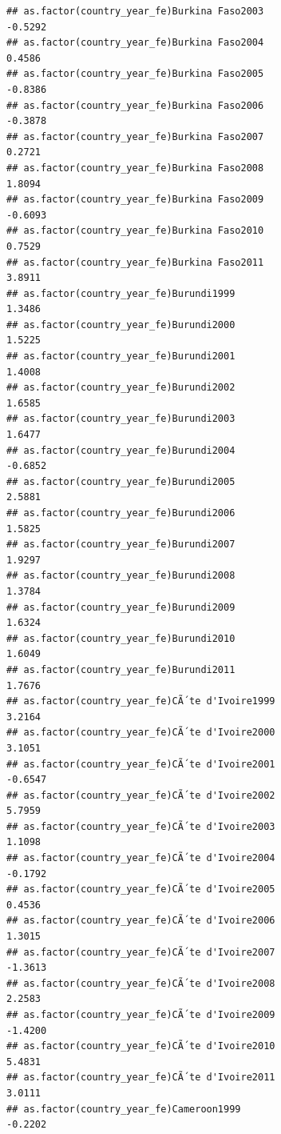 \documentclass[
  a4paper,
]{article}
\begin{document}
\begin{verbatim}
## as.factor(country_year_fe)Burkina Faso2003                     -0.5292
## as.factor(country_year_fe)Burkina Faso2004                      0.4586
## as.factor(country_year_fe)Burkina Faso2005                     -0.8386
## as.factor(country_year_fe)Burkina Faso2006                     -0.3878
## as.factor(country_year_fe)Burkina Faso2007                      0.2721
## as.factor(country_year_fe)Burkina Faso2008                      1.8094
## as.factor(country_year_fe)Burkina Faso2009                     -0.6093
## as.factor(country_year_fe)Burkina Faso2010                      0.7529
## as.factor(country_year_fe)Burkina Faso2011                      3.8911
## as.factor(country_year_fe)Burundi1999                           1.3486
## as.factor(country_year_fe)Burundi2000                           1.5225
## as.factor(country_year_fe)Burundi2001                           1.4008
## as.factor(country_year_fe)Burundi2002                           1.6585
## as.factor(country_year_fe)Burundi2003                           1.6477
## as.factor(country_year_fe)Burundi2004                          -0.6852
## as.factor(country_year_fe)Burundi2005                           2.5881
## as.factor(country_year_fe)Burundi2006                           1.5825
## as.factor(country_year_fe)Burundi2007                           1.9297
## as.factor(country_year_fe)Burundi2008                           1.3784
## as.factor(country_year_fe)Burundi2009                           1.6324
## as.factor(country_year_fe)Burundi2010                           1.6049
## as.factor(country_year_fe)Burundi2011                           1.7676
## as.factor(country_year_fe)CÃ´te d'Ivoire1999                    3.2164
## as.factor(country_year_fe)CÃ´te d'Ivoire2000                    3.1051
## as.factor(country_year_fe)CÃ´te d'Ivoire2001                   -0.6547
## as.factor(country_year_fe)CÃ´te d'Ivoire2002                    5.7959
## as.factor(country_year_fe)CÃ´te d'Ivoire2003                    1.1098
## as.factor(country_year_fe)CÃ´te d'Ivoire2004                   -0.1792
## as.factor(country_year_fe)CÃ´te d'Ivoire2005                    0.4536
## as.factor(country_year_fe)CÃ´te d'Ivoire2006                    1.3015
## as.factor(country_year_fe)CÃ´te d'Ivoire2007                   -1.3613
## as.factor(country_year_fe)CÃ´te d'Ivoire2008                    2.2583
## as.factor(country_year_fe)CÃ´te d'Ivoire2009                   -1.4200
## as.factor(country_year_fe)CÃ´te d'Ivoire2010                    5.4831
## as.factor(country_year_fe)CÃ´te d'Ivoire2011                    3.0111
## as.factor(country_year_fe)Cameroon1999                         -0.2202

\end{verbatim}
\end{document}
